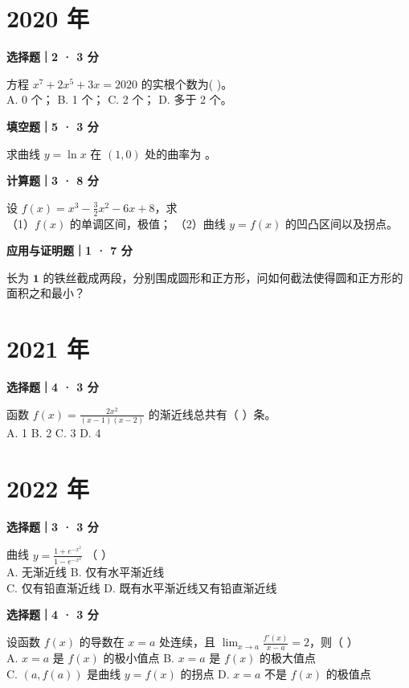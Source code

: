 

\section*{2020 年}


\textbf{选择题｜2 · 3 分}

方程 $x^7 + 2x^5 + 3x = 2020$ 的实根个数为( \quad )。\\
A. 0 个； \quad B. 1 个； \quad C. 2 个； \quad D. 多于 2 个。


\textbf{填空题｜5 · 3 分}

求曲线 $y = \ln x$ 在 $(1,0)$ 处的曲率为 \underline{\hspace{3cm}}。


\textbf{计算题｜3 · 8 分}

设 $f(x) = x^3 - \frac{3}{2}x^2 - 6x + 8$，求\\
（1）$f(x)$ 的单调区间，极值； \quad （2）曲线 $y = f(x)$ 的凹凸区间以及拐点。


\textbf{应用与证明题｜1 · 7 分}

长为 $\mathbf{1}$ 的铁丝截成两段，分别围成圆形和正方形，问如何截法使得圆和正方形的面积之和最小？


\section*{2021 年}


\textbf{选择题｜4 · 3 分}

函数 $f(x) = \frac{2x^2}{(x-1)(x-2)}$ 的渐近线总共有（ \quad ）条。\\
A. 1 \quad B. 2 \quad C. 3 \quad D. 4


\section*{2022 年}


\textbf{选择题｜3 · 3 分}

曲线 $y = \frac{1+e^{-x^2}}{1-e^{-x^2}}$ （ \quad ）\\
A. 无渐近线 \quad B. 仅有水平渐近线\\
C. 仅有铅直渐近线 \quad D. 既有水平渐近线又有铅直渐近线


\textbf{选择题｜4 · 3 分}

设函数 $f(x)$ 的导数在 $x = a$ 处连续，且 $\lim_{x \to a} \frac{f'(x)}{x-a} = 2$，则（ \quad ）\\
A. $x = a$ 是 $f(x)$ 的极小值点 \quad B. $x = a$ 是 $f(x)$ 的极大值点\\
C. $(a, f(a))$ 是曲线 $y = f(x)$ 的拐点 \quad D. $x = a$ 不是 $f(x)$ 的极值点


